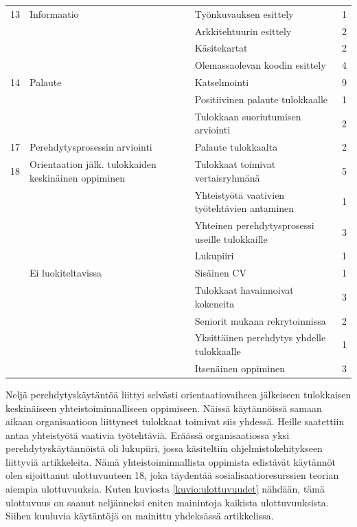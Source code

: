 \documentclass[utf8]{gradu3}
\begin{document}
\begin{scriptsize}
\begin{longtable}[c]{llll}
    \hline
    13 & Informaatio & Työnkuvauksen esittely & 1\\
    & & Arkkitehtuurin esittely & 2\\
    & & Käsitekartat & 2\\
    & & Olemassaolevan koodin esittely & 4\\
    \hline
    14 & Palaute & Katselmointi & 9\\
    & & Positiivinen palaute tulokkaalle & 1\\
    & & Tulokkaan suoriutumisen arviointi & 2\\
    \hline
    17 & Perehdytysprosessin arviointi & Palaute tulokkaalta & 2\\
    \hline
    18 & Orientaation jälk. tulokkaiden keskinäinen oppiminen & Tulokkaat toimivat vertaisryhmänä & 5\\
    & & Yhteistyötä vaativien työtehtävien antaminen & 1\\
    & & Yhteinen perehdytysprosessi useille tulokkaille & 3\\
    & & Lukupiiri & 1\\
    \hline
    & Ei luokiteltavissa & Sisäinen CV & 1 \\
    & & Tulokkaat havainnoivat kokeneita & 3\\
    & & Seniorit mukana rekrytoinnissa & 2\\
    & & Yksittäinen perehdytys yhdelle tulokkaalle & 1\\
    & & Itsenäinen oppiminen & 3\\
    \hline
    
    \end{longtable}
    \end{scriptsize}

Neljä perehdytyskäytäntöä liittyi selvästi orientaatiovaiheen jälkeiseen tulokkaisen keskinäiseen yhteistoiminnalliseen oppimiseen. Näissä käytännöissä samaan aikaan organisaatioon liittyneet tulokkaat toimivat siis yhdessä. Heille saatettiin antaa yhteistyötä vaativia työtehtäviä. Eräässä organisaatiossa yksi perehdytyskäytännöistä oli lukupiiri, jossa käsiteltiin ohjelmistokehitykseen liittyviä artikkeleita. Nämä yhteistoiminnallista oppimista edistävät käytännöt olen sijoittanut ulottuvuuteen 18, joka täydentää sosialisaatioresurssien teorian aiempia ulottuvuuksia. Kuten kuviosta \ref{kuvio:ulottuvuudet} nähdään, tämä ulottuvuus on saanut neljänneksi eniten mainintoja kaikista ulottuvuuksista. Siihen kuuluvia käytäntöjä on mainittu yhdeksässä artikkelissa. 
\end{document}

